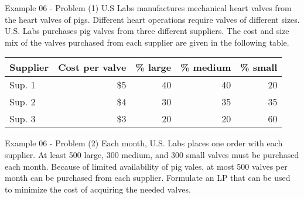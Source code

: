 \begin{frame}{Example 06 - Problem (1)}
U.S Labs manufactures mechanical heart valves from the heart valves of pigs.
Different heart operations require valves of different sizes. U.S. Labs
purchases pig valves from three different suppliers. The cost and size mix of
the valves purchased from each supplier are given in the following table.

\begin{center}
\begin{tabular}{lrrrr}
\hline
  \cellcolor{gray90}\textbf{Supplier}
& \cellcolor{gray90}\textbf{Cost per valve}
& \cellcolor{gray90}\textbf{\% large}
& \cellcolor{gray90}\textbf{\% medium}
& \cellcolor{gray90}\textbf{\% small} \\
\hline
Sup. 1 & \$5 & 40 & 40 & 20 \\
Sup. 2 & \$4 & 30 & 35 & 35 \\
Sup. 3 & \$3 & 20 & 20 & 60 \\
\hline
\end{tabular}
\end{center}

\end{frame}

\begin{frame}{Example 06 - Problem (2)}
Each month, U.S. Labs places one order with each supplier. At least 500 large,
300 medium, and 300 small valves must be purchased each month.
\vspace{1cm}
Because of limited availability of pig vales, at most 500 valves per month can
be purchased from each supplier. Formulate an LP that can be used to minimize
the cost of acquiring the needed valves.

\end{frame}
